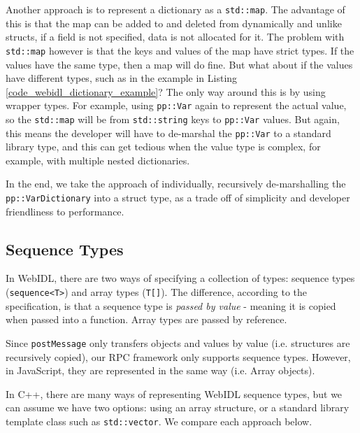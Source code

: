 Another approach is to represent a dictionary as a \lstinline{std::map}. The advantage of this is that the map can be added to and deleted from dynamically and unlike structs, if a field is not specified, data is not allocated for it. The problem with \lstinline{std::map} however is that the keys and values of the map have strict types. If the values have the same type, then a map will do fine. But what about if the values have different types, such as in the example in Listing \ref{code_webidl_dictionary_example}? The only way around this is by using wrapper types. For example, using \lstinline{pp::Var} again to represent the actual value, so the \lstinline{std::map} will be from \lstinline{std::string} keys to \lstinline{pp::Var} values. But again, this means the developer will have to de-marshal the \lstinline{pp::Var} to a standard library type, and this can get tedious when the value type is complex, for example, with multiple nested dictionaries.

In the end, we take the approach of individually, recursively de-marshalling the \lstinline{pp::VarDictionary} into a struct type, as a trade off of simplicity and developer friendliness to performance.

\subsection{Sequence Types} %
\label{sub:sequence_types}
In WebIDL, there are two ways of specifying a collection of types: sequence types (\lstinline{sequence<T>}) and array types (\lstinline{T[]}). The difference, according to the specification, is that a sequence type is \emph{passed by value} - meaning it is copied when passed into a function. Array types are passed by reference. 

Since \lstinline{postMessage} only transfers objects and values by value (i.e. structures are recursively copied), our RPC framework only supports sequence types. However, in JavaScript, they are represented in the same way (i.e. Array objects).

In C++, there are many ways of representing WebIDL sequence types, but we can assume we have two options: using an array structure, or a standard library template class such as \lstinline{std::vector}. We compare each approach below.

